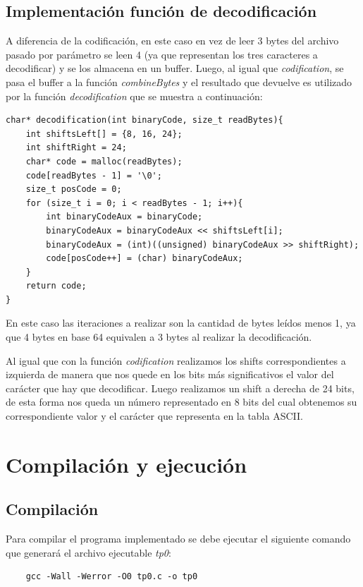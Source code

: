 \documentclass[titlepage,a4paper]{article}
\begin{document}
\subsection{Implementación función de decodificación}

A diferencia de la codificación, en este caso en vez de leer 3 bytes del archivo pasado por parámetro se leen 4 (ya que representan los tres caracteres a decodificar) y se los almacena en un buffer.
Luego, al igual que \textit{codification}, se pasa el buffer a la función \textit{combineBytes} y el resultado que devuelve es utilizado por la función \textit{decodification} que se muestra a continuación:

\begin{lstlisting}[style=customC]
char* decodification(int binaryCode, size_t readBytes){
	int shiftsLeft[] = {8, 16, 24};
	int shiftRight = 24; 
	char* code = malloc(readBytes);
	code[readBytes - 1] = '\0';
	size_t posCode = 0;
	for (size_t i = 0; i < readBytes - 1; i++){
		int binaryCodeAux = binaryCode;
		binaryCodeAux = binaryCodeAux << shiftsLeft[i];
		binaryCodeAux = (int)((unsigned) binaryCodeAux >> shiftRight);
		code[posCode++] = (char) binaryCodeAux;
	}
	return code;
}
\end{lstlisting}

En este caso las iteraciones a realizar son la cantidad de bytes leídos menos 1, ya que 4 bytes en base 64 equivalen a 3 bytes al realizar la decodificación. \newline

Al igual que con la función \textit{codification} realizamos los shifts correspondientes a izquierda de manera que nos quede en los bits más significativos el valor del carácter que hay que decodificar. Luego realizamos un shift a derecha de 24 bits, de esta forma nos queda un número representado en 8 bits del cual obtenemos su correspondiente valor y el carácter que representa en la tabla ASCII. 

\section{Compilación y ejecución}

\subsection{Compilación}
Para compilar el programa implementado se debe ejecutar el siguiente comando que generará el archivo ejecutable \textit{tp0}:
\begin{verbatim}
    gcc -Wall -Werror -O0 tp0.c -o tp0
\end{verbatim}
\end{document}
